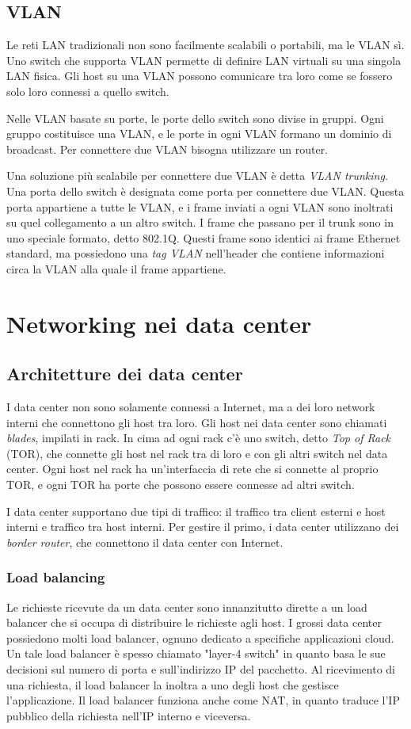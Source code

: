 \documentclass[11pt]{book}
\begin{document}
\subsection{VLAN}
Le reti LAN tradizionali non sono facilmente scalabili o portabili, ma le VLAN sì. Uno switch che supporta VLAN permette 
di definire LAN virtuali su una singola LAN fisica. Gli host su una VLAN possono comunicare tra loro come se fossero solo 
loro connessi a quello switch. 

Nelle VLAN basate su porte, le porte dello switch sono divise in gruppi. Ogni gruppo costituisce una VLAN, e le porte in 
ogni VLAN formano un dominio di broadcast. Per connettere due VLAN bisogna utilizzare un router.

Una soluzione più scalabile per connettere due VLAN è detta \textit{VLAN trunking}. Una porta dello switch è designata 
come porta per connettere due VLAN. Questa porta appartiene a tutte le VLAN, e i frame inviati a ogni VLAN sono inoltrati 
su quel collegamento a un altro switch. I frame che passano per il trunk sono in uno speciale formato, detto 802.1Q. Questi 
frame sono identici ai frame Ethernet standard, ma possiedono una \textit{tag VLAN} nell'header che contiene informazioni 
circa la VLAN alla quale il frame appartiene.
\section{Networking nei data center}
\subsection{Architetture dei data center}
I data center non sono solamente connessi a Internet, ma a dei loro network interni che connettono gli host tra loro. Gli 
host nei data center sono chiamati \textit{blades}, impilati in rack. In cima ad ogni rack c'è uno switch, detto 
\textit{Top of Rack} (TOR), che connette gli host nel rack tra di loro e con gli altri switch nel data center. Ogni host 
nel rack ha un'interfaccia di rete che si connette al proprio TOR, e ogni TOR ha porte che possono essere connesse ad altri 
switch.

I data center supportano due tipi di traffico: il traffico tra client esterni e host interni e traffico tra host interni.
Per gestire il primo, i data center utilizzano dei \textit{border router}, che connettono il data center con Internet.
\subsubsection{Load balancing}
Le richieste ricevute da un data center sono innanzitutto dirette a un load balancer che si occupa di distribuire le richieste 
agli host. I grossi data center possiedono molti load balancer, ognuno dedicato a specifiche applicazioni cloud. Un tale 
load balancer è spesso chiamato "layer-4 switch" in quanto basa le sue decisioni sul numero di porta e sull'indirizzo 
IP del pacchetto. Al ricevimento di una richiesta, il load balancer la inoltra a uno degli host che gestisce l'applicazione.
Il load balancer funziona anche come NAT, in quanto traduce l'IP pubblico della richiesta nell'IP interno e viceversa.
\end{document}
